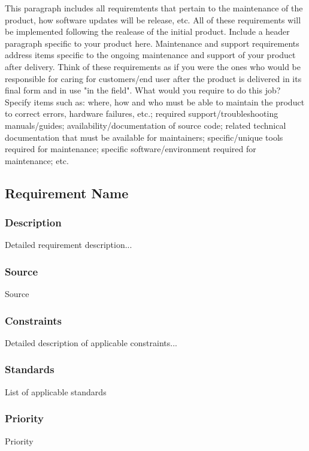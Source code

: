 This paragraph includes all requiremtents that pertain to the maintenance of the product, how software updates will be release, etc. All of these requirements will be implemented following the realease of the initial product. 
Include a header paragraph specific to your product here. Maintenance and support requirements address items specific to the ongoing maintenance and support of your product after delivery. Think of these requirements as if you were the ones who would be responsible for caring for customers/end user after the product is delivered in its final form and in use "in the field". What would you require to do this job? Specify items such as: where, how and who must be able to maintain the product to correct errors, hardware failures, etc.; required support/troubleshooting manuals/guides; availability/documentation of source code; related technical documentation that must be available for maintainers; specific/unique tools required for maintenance; specific software/environment required for maintenance; etc.

\subsection{Requirement Name}
\subsubsection{Description}
Detailed requirement description...
\subsubsection{Source}
Source
\subsubsection{Constraints}
Detailed description of applicable constraints...
\subsubsection{Standards}
List of applicable standards
\subsubsection{Priority}
Priority
